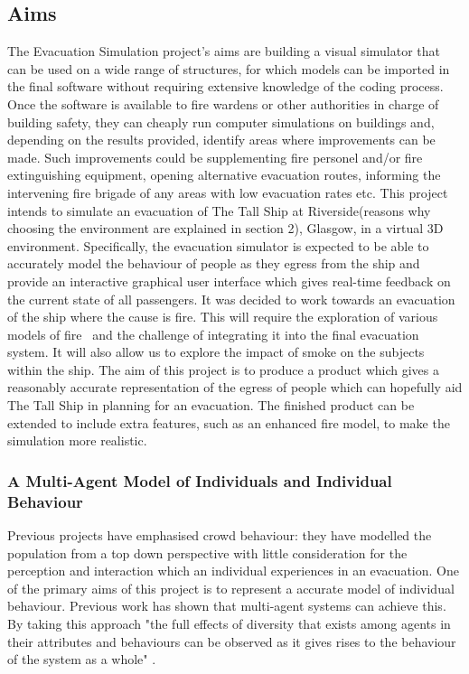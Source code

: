 \subsection{Aims}
The Evacuation Simulation project’s aims are building a visual simulator that
can be used on a wide range of structures, for which models can be imported in
the final software without requiring extensive knowledge of the coding process.
Once the software is available to fire wardens or other authorities in charge of
building safety, they can cheaply run computer simulations on buildings and,
depending on the results provided, identify areas where improvements can be
made. Such improvements could be supplementing fire personel and/or fire
extinguishing equipment, opening alternative evacuation routes,
informing the intervening fire brigade of any areas with low evacuation rates etc.
This project intends to simulate an evacuation of The Tall Ship at Riverside(reasons why choosing the environment are explained in section 2),
Glasgow, in a virtual 3D environment. 
Specifically, the evacuation simulator is
expected to be able to accurately model the behaviour of people as they egress
from the ship and provide an interactive graphical user interface which gives
real-time feedback on the current state of all passengers.
It was decided to work towards an evacuation of the ship where the cause is
fire. This will require the exploration of various models of fire~\cite{fireEvacuationProcedure} and the challenge
of integrating it into the final evacuation system. It will also allow us to explore
the impact of smoke on the subjects within the ship.
The aim of this project is to produce a product which gives a
reasonably accurate representation of the egress of people which can hopefully
aid The Tall Ship in planning for an evacuation. The finished product can be
extended to include extra features, such as an enhanced fire model, to make the
simulation more realistic.

\subsubsection{A Multi-Agent Model of Individuals and Individual Behaviour}
Previous projects have emphasised crowd behaviour: they have modelled the population from a top down 
perspective with little consideration for the perception and interaction which an individual experiences in an evacuation.
One of the primary aims of this project is to represent a accurate model of individual behaviour.
Previous work has shown that multi-agent systems can achieve this. By taking this approach "the full effects of diversity that exists among agents in their attributes and behaviours can be observed as it
gives rises to the behaviour of the system as a whole" \cite{AgentBasedTutorial}.

